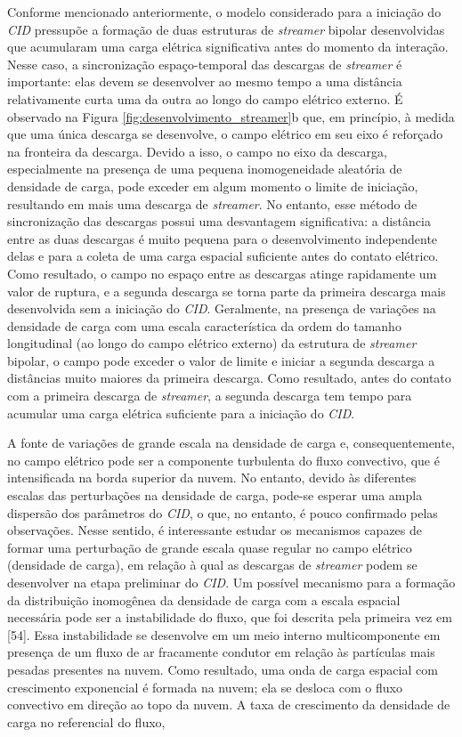 \documentclass[a4paper, 12pt, onecolumn,singlespacing]{article}
\begin{document}
	Conforme mencionado anteriormente, o modelo considerado para a iniciação do \textit{CID} pressupõe a formação de duas estruturas de \textit{streamer} bipolar desenvolvidas que acumularam uma carga elétrica significativa antes do momento da interação. Nesse caso, a sincronização espaço-temporal das descargas de \textit{streamer} é importante: elas devem se desenvolver ao mesmo tempo a uma distância relativamente curta uma da outra ao longo do campo elétrico externo. É observado na Figura \ref{fig:desenvolvimento_streamer}b que, em princípio, à medida que uma única descarga se desenvolve, o campo elétrico em seu eixo é reforçado na fronteira da descarga. Devido a isso, o campo no eixo da descarga, especialmente na presença de uma pequena inomogeneidade aleatória de densidade de carga, pode exceder em algum momento o limite de iniciação, resultando em mais uma descarga de \textit{streamer}. No entanto, esse método de sincronização das descargas possui uma desvantagem significativa: a distância entre as duas descargas é muito pequena para o desenvolvimento independente delas e para a coleta de uma carga espacial suficiente antes do contato elétrico. Como resultado, o campo no espaço entre as descargas atinge rapidamente um valor de ruptura, e a segunda descarga se torna parte da primeira descarga mais desenvolvida sem a iniciação do \textit{CID}. Geralmente, na presença de variações na densidade de carga com uma escala característica da ordem do tamanho longitudinal (ao longo do campo elétrico externo) da estrutura de \textit{streamer} bipolar, o campo pode exceder o valor de limite e iniciar a segunda descarga a distâncias muito maiores da primeira descarga. Como resultado, antes do contato com a primeira descarga de \textit{streamer}, a segunda descarga tem tempo para acumular uma carga elétrica suficiente para a iniciação do \textit{CID}.
	
	A fonte de variações de grande escala na densidade de carga e, consequentemente, no campo elétrico pode ser a componente turbulenta do fluxo convectivo, que é intensificada na borda superior da nuvem. No entanto, devido às diferentes escalas das perturbações na densidade de carga, pode-se esperar uma ampla dispersão dos parâmetros do \textit{CID}, o que, no entanto, é pouco confirmado pelas observações. Nesse sentido, é interessante estudar os mecanismos capazes de formar uma perturbação de grande escala quase regular no campo elétrico (densidade de carga), em relação à qual as descargas de \textit{streamer} podem se desenvolver na etapa preliminar do \textit{CID}. Um possível mecanismo para a formação da distribuição inomogênea da densidade de carga com a escala espacial necessária pode ser a instabilidade do fluxo, que foi descrita pela primeira vez em [54]. Essa instabilidade se desenvolve em um meio interno multicomponente em presença de um fluxo de ar fracamente condutor em relação às partículas mais pesadas presentes na nuvem. Como resultado, uma onda de carga espacial com crescimento exponencial é formada na nuvem; ela se desloca com o fluxo convectivo em direção ao topo da nuvem. A taxa de crescimento da densidade de carga no referencial do fluxo,
	
\end{document}
